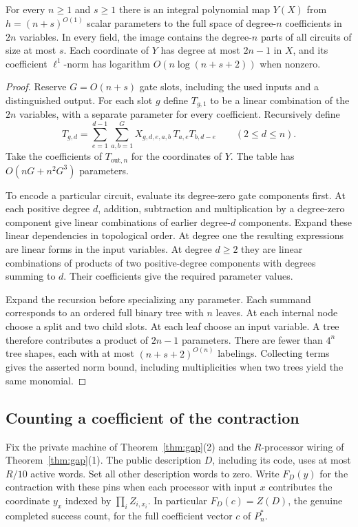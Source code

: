 \begin{lemma}\label{lem:parse-tables}
For every $n\ge1$ and $s\ge 1$ there is an integral polynomial map
$Y(X)$ from $h=(n+s)^{O(1)}$ scalar parameters to the full space of
degree-$n$ coefficients in $2n$ variables. In every field, the image
contains the degree-$n$ parts of all circuits of size at most $s$.
Each coordinate of $Y$ has degree at most $2n-1$ in $X$, and its
coefficient $\ell^1$-norm has logarithm $O(n\log(n+s+2))$ when nonzero.
\end{lemma}
\begin{proof}
Reserve $G=O(n+s)$ gate slots, including the used inputs and a
distinguished output. For each slot $g$ define $T_{g,1}$ to be a
linear combination of the $2n$ variables, with a separate parameter
for every coefficient. Recursively define
\[
 T_{g,d}=\sum_{e=1}^{d-1}\sum_{a,b=1}^{G}
     X_{g,d,e,a,b}\,T_{a,e}T_{b,d-e}\qquad (2\le d\le n).
\]
Take the coefficients of $T_{\mathrm{out},n}$ for the coordinates of
$Y$. The table has $O(nG+n^2G^3)$ parameters.

To encode a particular circuit, evaluate its degree-zero gate
components first. At each positive degree $d$, addition, subtraction
and multiplication by a degree-zero component give linear combinations
of earlier degree-$d$ components. Expand these linear dependencies in
topological order. At degree one the resulting expressions are linear
forms in the input variables. At degree $d\ge2$ they are linear
combinations of products of two positive-degree components with degrees
summing to $d$. Their coefficients give the required parameter values.

Expand the recursion before specializing any parameter. Each summand
corresponds to an ordered full binary tree with $n$ leaves. At each
internal node choose a split and two child slots. At each leaf choose
an input variable. A tree therefore contributes a product of $2n-1$
parameters. There are fewer than $4^n$ tree shapes, each with at most
$(n+s+2)^{O(n)}$ labelings. Collecting terms gives the asserted norm
bound, including multiplicities when two trees yield the same monomial.
\end{proof}

\subsection{Counting a coefficient of the contraction}
Fix the private machine of Theorem~\ref{thm:gap}(2) and the
$R$-processor wiring of Theorem~\ref{thm:gap}(1). The public description
$D$, including its code, uses at most $R/10$ active words. Set all
other description words to zero. Write $F_D(y)$ for the contraction
with these pins when each processor with input $x$ contributes the
coordinate $y_x$ indexed by $\prod_i Z_{i,x_i}$. In particular
$F_D(c)=Z(D)$, the genuine completed success count, for the full
coefficient vector $c$ of $P_n^*$.

